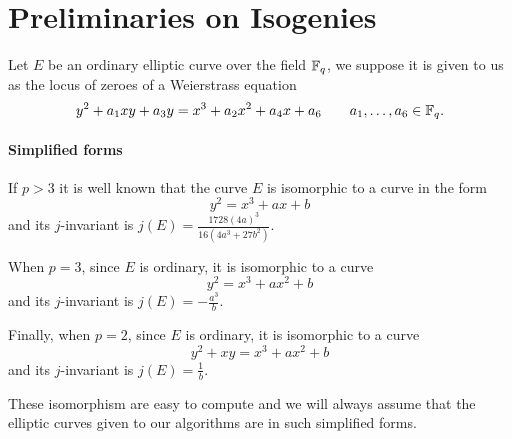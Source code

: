 \section{Preliminaries on Isogenies}

Let $E$ be an ordinary elliptic curve over the field $\mathbb{F}_q$, we
suppose it is given to us as the locus of zeroes of a Weierstrass
equation
\[y^2 + a_1xy + a_3y = x^3 + a_2x^2 + a_4x + a_6
\qquad a_1,\ldots,a_6\in\mathbb{F}_q\text{.}\]

\paragraph{Simplified forms} If $p>3$ it is well known that the curve
$E$ is isomorphic to a curve in the form
\begin{equation}
  \label{eq:weierstrass>3}
  y^2 = x^3 + ax + b
\end{equation}
and its $j$-invariant is $j(E) = \frac{1728(4a)^3}{16(4a^3 + 27b^2)}$.

When $p=3$, since $E$ is ordinary, it is isomorphic to a curve
\begin{equation}
  \label{eq:weierstrass=3}
  y^2 = x^3 + ax^2 + b
\end{equation}
and its $j$-invariant is $j(E) = -\frac{a^3}{b}$.

Finally, when $p=2$, since $E$ is ordinary, it is isomorphic to a curve
\begin{equation}
  \label{eq:weierstrass=2}
  y^2 + xy = x^3 + ax^2 + b
\end{equation}
and its $j$-invariant is $j(E) = \frac{1}{b}$.

These isomorphism are easy to compute and we will always assume that
the elliptic curves given to our algorithms are in such simplified
forms.


%

